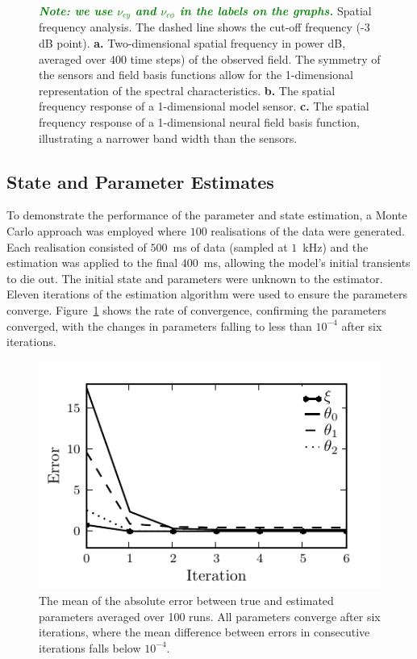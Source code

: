 \documentclass[10pt,a4paper]{article}
\newcommand{\dean}[1]{\textsf{\emph{\textbf{\textcolor{green}{#1}}}}}
\begin{document}
\begin{figure}
\begin{center}
	\end{center}
	\caption{\dean{Note: we use $\nu_{cy}$ and $\nu_{c\phi}$ in the labels on the graphs.} Spatial frequency analysis. The dashed line shows the cut-off frequency (-3 dB point). \textbf{a.} Two-dimensional spatial frequency in power dB, averaged over 400 time steps) of the observed field. The symmetry of the sensors and field basis functions allow for the 1-dimensional representation of the spectral characteristics. \textbf{b.} The spatial frequency response of a 1-dimensional model sensor. \textbf{c.} The spatial frequency response of a 1-dimensional neural field basis function, illustrating a narrower band width than the sensors.} 
\end{figure}

\subsection{State and Parameter Estimates} 
\label{sec:state_and_param_results}
To demonstrate the performance of the parameter and state estimation, a Monte Carlo approach was employed where $100$ realisations of the data were generated. Each realisation consisted of $500$~ms of data (sampled at $1$~kHz) and the estimation was applied to the final $400$~ms, allowing the model's initial transients to die out. The initial state and parameters were unknown to the estimator. Eleven iterations of the estimation algorithm were used to ensure the parameters  converge. Figure~\ref{fig:ParametersConvergence} shows the rate of convergence, confirming the parameters converged, with the changes in parameters falling to less than $10^{-4}$ after six iterations.
\begin{figure}
        \centering
\includegraphics{./Graph/convergence.pdf}
\caption{The mean of the absolute error between true and estimated parameters averaged over 100 runs. All parameters converge after six iterations, where the mean difference between errors in consecutive iterations falls below $10^{-4}$.}
\label{fig:ParametersConvergence}
\end{figure}
\end{document}
